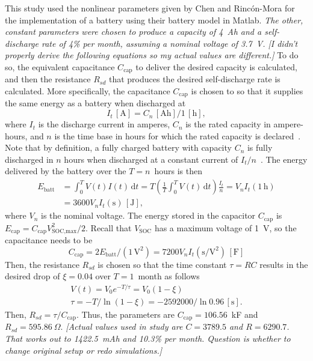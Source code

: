 This study used the nonlinear parameters given by Chen and Rinc\'on-Mora for the implementation of a battery using their battery model in Matlab. \emph{The other, constant parameters were chosen to produce a capacity of 4~Ah and a self-discharge rate of 4\% per month, assuming a nominal voltage of 3.7~V. [I didn't properly derive the following equations so my actual values are different.]} To do so, the equivalent capacitance $C_\text{cap}$ to deliver the desired capacity is calculated, and then the resistance $R_{sd}$
that produces the desired self-discharge rate is calculated. More specifically, the capacitance $C_\text{cap}$ is chosen to so that it supplies the same energy as a battery when discharged at
\begin{equation}
    I_t\,[\text{A}] = C_n\,[\text{Ah}] / 1\,[\text{h}],
\end{equation}
where $I_t$ is the discharge current in amperes, $C_n$ is the rated capacity in ampere-hours, and $n$ is the time base in hours for which the rated capacity is declared~\cite{iec61434,linden01_ch3}. Note that by definition, a fully charged battery with capacity $C_n$ is fully discharged in $n$ hours when discharged at a constant current of $I_t/n$~\cite{linden01_ch3}. The energy delivered by the battery over the $T=n$~hours is then
\begin{align}
    E_\text{batt} &= \int_0^T V(t) I(t) \,\mathrm{d}t = T \left( \frac{1}{T} \int_0^T V(t)\,\mathrm{d}t \right) \frac{I_t}{n} = V_n I_t (1\,\text{h}) \\
    &= 3600 V_n I_t (\text{s}) \,[\text{J}],
\end{align}
where $V_n$ is the nominal voltage. The energy stored in the capacitor $C_\text{cap}$ is $E_\text{cap} = C_\text{cap} V_\text{SOC,max}^2 / 2$. Recall that $V_\text{SOC}$ has a maximum voltage of 1~V, so the capacitance needs to be
\begin{equation}
    C_\text{cap} = 2E_\text{batt}/(1\,\text{V}^2) = 7200 V_n I_t (\text{s}/\text{V}^2) \,[\text{F}]
\end{equation}
Then, the resistance $R_{sd}$ is chosen so that the time constant $\tau=RC$ results in the desired drop of $\xi=0.04$ over $T=1$~month as follows
\begin{gather}
    V(t) = V_0 e^{-T/\tau} = V_0 (1-\xi) \\
    \tau = -T/\ln(1-\xi) = -2592000/\ln 0.96 \,[\text{s}].
\end{gather}
Then, $R_{sd}=\tau/C_\text{cap}$. Thus, the parameters are $C_\text{cap}=106.56$~kF and $R_{sd}=595.86~\Omega$. \emph{[Actual values used in study are $C=3789.5$ and $R=6290.7$. That works out to 1422.5~mAh and 10.3\% per month. Question is whether to change original setup or redo simulations.]}

